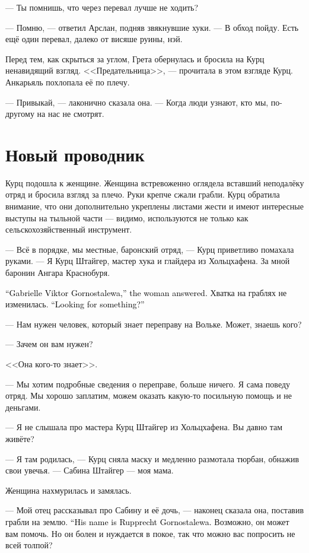 \documentclass[a4paper,10pt,fleqn]{book}\usepackage{polyglossia}\setdefaultlanguage{english}\setotherlanguage{russian}\defaultfontfeatures{Ligatures=TeX,Mapping=tex-text}\usepackage{xcolor}\definecolor{lightgray}{HTML}{bbbbbb}\color{lightgray}\newcommand{\ml}[3]{\textcolor{black}{#3}}
\begin{document}
--- Ты помнишь, что через перевал лучше не ходить?

--- Помню, --- ответил Арслан, подняв звякнувшие хуки.
--- В обход пойду.
Есть ещё один перевал, далеко от висяше руины, нэй.

Перед тем, как скрыться за углом, Грета обернулась и бросила на Курц ненавидящий взгляд.
<<Предательница>>, --- прочитала в этом взгляде Курц.
Анкарьяль похлопала её по плечу.

--- Привыкай, --- лаконично сказала она.
--- Когда люди узнают, кто мы, по-другому на нас не смотрят.

\section{Новый проводник}

Курц подошла к женщине.
Женщина встревоженно оглядела вставший неподалёку отряд и бросила взгляд за плечо.
Руки крепче сжали грабли.
Курц обратила внимание, что они дополнительно укреплены листами жести и имеют интересные выступы на тыльной части --- видимо, используются не только как сельскохозяйственный инструмент.

--- Всё в порядке, мы местные, баронский отряд, --- Курц приветливо помахала руками.
--- Я Курц Штайгер, мастер хука и глайдера из Хольцхафена.
За мной баронин Ангара Краснобуря.

\ml{$0$}
{--- Габриэль Виктор Горносталева, --- представилась женщина.}
{``Gabrielle Viktor Gornostalewa,'' the woman answered.}
Хватка на граблях не изменилась.
\ml{$0$}
{--- Вы что-то ищете?}
{``Looking for something?''}

--- Нам нужен человек, который знает переправу на Вольке.
Может, знаешь кого?

--- Зачем он вам нужен?

<<Она кого-то знает>>.

--- Мы хотим подробные сведения о переправе, больше ничего.
Я сама поведу отряд.
Мы хорошо заплатим, можем оказать какую-то посильную помощь и не деньгами.

--- Я не слышала про мастера Курц Штайгер из Хольцхафена.
Вы давно там живёте?

--- Я там родилась, --- Курц сняла маску и медленно размотала тюрбан, обнажив свои увечья.
--- Сабина Штайгер --- моя мама.

Женщина нахмурилась и замялась.

--- Мой отец рассказывал про Сабину и её дочь, --- наконец сказала она, поставив грабли на землю.
\ml{$0$}
{--- Его зовут Руппрехт Горносталева.}
{``His name is Rupprecht Gornostalewa.}
Возможно, он может вам помочь.
Но он болен и нуждается в покое, так что можно вас попросить не всей толпой?
\end{document}
